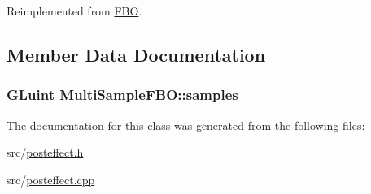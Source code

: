 Reimplemented from \hyperlink{class_f_b_o_a549d867aff12a3ccb0876552e9a42304}{F\+B\+O}.



\subsection{Member Data Documentation}
\hypertarget{class_multi_sample_f_b_o_aa47ee55c2bcd0f28acb9aac1d5a3633c}{}
\subsubsection[{samples}]{\setlength{\rightskip}{0pt plus 5cm}G\+Luint Multi\+Sample\+F\+B\+O\+::samples}\label{class_multi_sample_f_b_o_aa47ee55c2bcd0f28acb9aac1d5a3633c}


The documentation for this class was generated from the following files\+:\begin{DoxyCompactItemize}
\item 
src/\hyperlink{posteffect_8h}{posteffect.\+h}\item 
src/\hyperlink{posteffect_8cpp}{posteffect.\+cpp}\end{DoxyCompactItemize}
